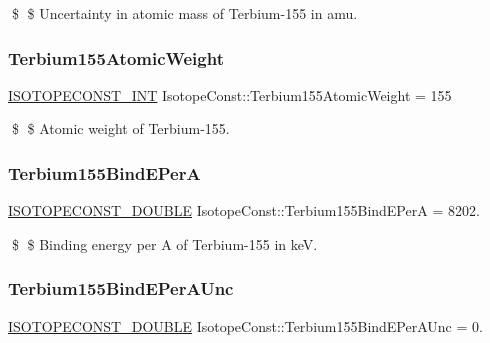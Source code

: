 \$ \$ Uncertainty in atomic mass of Terbium-\/155 in amu. \mbox{\label{group___isotope_const-_terbium-_tb155_ga927d15392e47d49163a9696ee2dbac24}} 
\subsubsection{\texorpdfstring{Terbium155\+Atomic\+Weight}{Terbium155AtomicWeight}}
{\footnotesize\ttfamily \mbox{\hyperlink{group___isotope_const-_macros_ga5f18360b3e99483a35c32d789e62621c}{I\+S\+O\+T\+O\+P\+E\+C\+O\+N\+S\+T\+\_\+\+I\+NT}} Isotope\+Const\+::\+Terbium155\+Atomic\+Weight = 155}

\$ \$ Atomic weight of Terbium-\/155. \mbox{\label{group___isotope_const-_terbium-_tb155_ga1bf795f78d33aed2f300270c40ca3eba}} 
\subsubsection{\texorpdfstring{Terbium155\+Bind\+E\+PerA}{Terbium155BindEPerA}}
{\footnotesize\ttfamily \mbox{\hyperlink{group___isotope_const-_macros_ga8f45a7272ce02c0b4c65c44636ed719a}{I\+S\+O\+T\+O\+P\+E\+C\+O\+N\+S\+T\+\_\+\+D\+O\+U\+B\+LE}} Isotope\+Const\+::\+Terbium155\+Bind\+E\+PerA = 8202.}

\$ \$ Binding energy per A of Terbium-\/155 in keV. \mbox{\label{group___isotope_const-_terbium-_tb155_gac1e2275b59ec218e4dc6b30286c65c15}} 
\subsubsection{\texorpdfstring{Terbium155\+Bind\+E\+Per\+A\+Unc}{Terbium155BindEPerAUnc}}
{\footnotesize\ttfamily \mbox{\hyperlink{group___isotope_const-_macros_ga8f45a7272ce02c0b4c65c44636ed719a}{I\+S\+O\+T\+O\+P\+E\+C\+O\+N\+S\+T\+\_\+\+D\+O\+U\+B\+LE}} Isotope\+Const\+::\+Terbium155\+Bind\+E\+Per\+A\+Unc = 0.}

